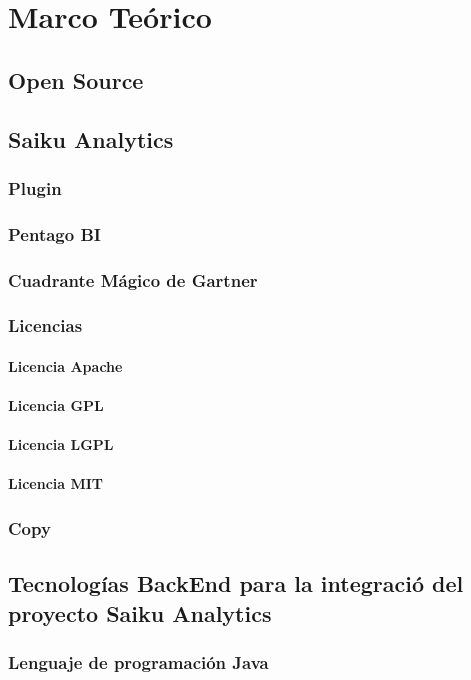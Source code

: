 \chapter{Marco Teórico} \label{chapter:II}
\section{Open Source}
\section{Saiku Analytics}
	\subsection{Plugin}
	\subsection{Pentago BI}
	\subsection{Cuadrante M\'{a}gico de Gartner}
	\subsection{Licencias}
		\subsubsection{Licencia Apache}
		\subsubsection{Licencia GPL}
		\subsubsection{Licencia LGPL}
		\subsubsection{Licencia MIT}
	\subsection{Copy}
\section{Tecnolog\'{i}as BackEnd para la integraci\'{o} del proyecto Saiku Analytics}
	\subsection{Lenguaje de programaci\'{o}n Java}

